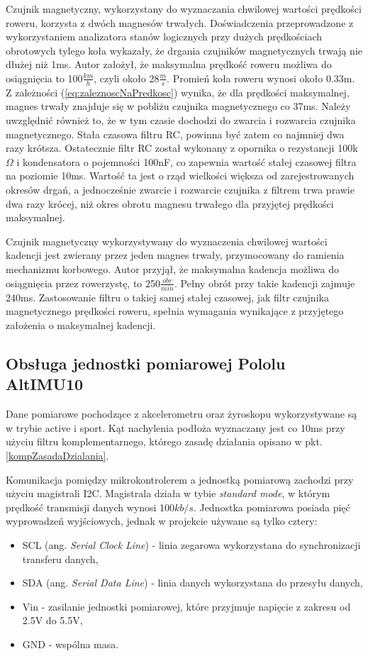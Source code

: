 Czujnik magnetyczny, wykorzystany do wyznaczania chwilowej wartości prędkości roweru, korzysta z dwóch magnesów trwałych. Doświadczenia przeprowadzone z wykorzystaniem analizatora stanów logicznych przy dużych prędkościach obrotowych tylego koła wykazały, że drgania czujników magnetycznych trwają nie dłużej niż 1ms.  Autor założył, że maksymalna prędkość roweru możliwa do osiągnięcia to 100$\frac{km}{h}$, czyli około 28$\frac{m}{s}$. Promień koła roweru wynosi około 0.33m. Z zależności (\ref{eq:zaleznoscNaPredkosc}) wynika, że dla prędkości maksymalnej, magnes trwały znajduje się w pobliżu czujnika magnetycznego co 37ms. Należy uwzględnić również to, że w tym czasie dochodzi do zwarcia i rozwarcia czujnika magnetycznego. Stała czasowa filtru RC, powinna być zatem co najmniej dwa razy krótsza. Ostatecznie filtr RC został wykonany z opornika o rezystancji 100k$\Omega$ i kondensatora o pojemności 100nF, co zapewnia wartość stałej czasowej filtra na poziomie 10ms. Wartość ta jest o rząd wielkości większa od zarejestrowanych okresów drgań, a jednocześnie zwarcie i rozwarcie czujnika z filtrem trwa prawie dwa razy krócej, niż okres obrotu magnesu trwałego dla przyjętej prędkości maksymalnej.

Czujnik magnetyczny wykorzystywany do wyznaczenia chwilowej wartości kadencji jest zwierany przez jeden magnes trwały, przymocowany do ramienia mechanizmu korbowego. Autor przyjął, że maksymalna kadencja możliwa do osiągnięcia przez rowerzystę, to 250$\frac{obr}{min}$. Pełny obrót przy takie kadencji zajmuje 240ms. Zastosowanie filtru o takiej samej stałej czasowej, jak filtr czujnika magnetycznego prędkości roweru, spełnia wymagania wynikające z przyjętego założenia o maksymalnej kadencji. 
\subsection{Obsługa jednostki pomiarowej Pololu AltIMU10}
Dane pomiarowe pochodzące z akcelerometru oraz żyroskopu wykorzystywane są w trybie active i sport. Kąt nachylenia podłoża wyznaczany jest co 10ms przy użyciu filtru komplementarnego, którego zasadę działania opisano w pkt. \ref{kompZasadaDzialania}. 
 
Komunikacja pomiędzy mikrokontrolerem a jednostką pomiarową zachodzi przy użyciu magistrali I2C. Magistrala działa w tybie \textit{standard mode}, w którym prędkość transmisji danych wynosi 100$kb/s$. Jednostka pomiarowa posiada pięć wyprowadzeń wyjściowych, jednak w projekcie używane są tylko cztery:
\begin{itemize}
    \item
    SCL (ang. {\em Serial Clock Line}) - linia zegarowa wykorzystana do synchronizacji transferu danych,
    \item
    SDA (ang. {\em Serial Data Line}) - linia danych wykorzystana do przesyłu danych,
    \item
    Vin - zasilanie jednostki pomiarowej, które przyjmuje napięcie z zakresu od 2.5V do 5.5V,
    \item
    GND - wspólna masa.
\end{itemize} 

